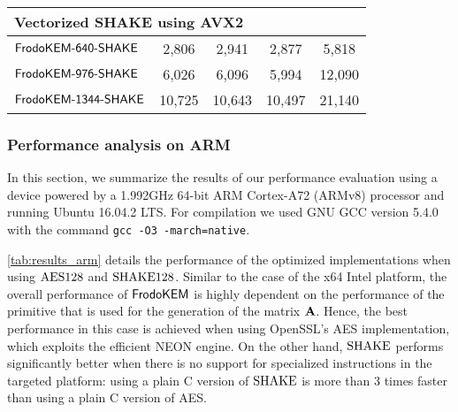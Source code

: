 \begin{table}[t]
\begin{tabular}{l|c c c|c}
\midrule
\multicolumn{5}{l}{\bf Vectorized SHAKE using AVX2} \\
\midrule
$\textsf{\upshape\mdseries FrodoKEM-640-SHAKE}$            &           2,806                  &           2,941                  &                2,877             &               5,818        \\
$\textsf{\upshape\mdseries FrodoKEM-976-SHAKE}$          &           6,026                  &           6,096                  &                5,994             &              12,090        \\
$\textsf{\upshape\mdseries FrodoKEM-1344-SHAKE}$          &          10,725                  &          10,643                &               10,497             &              21,140        \\
\bottomrule
\end{tabular}
\end{table}


\subsubsection{Performance analysis on ARM}\label{sec:results_arm}

\ifshoworiginal
In this section, we summarize the results of our performance evaluation using a device powered by a 1.992GHz 64-bit ARM Cortex-A72 (ARMv8) processor and running Ubuntu 16.04.2 LTS. For compilation we used GNU GCC version 5.4.0 with the command {\tt gcc -O3 -march=native}. 

\autoref{tab:results_arm} details the performance of the optimized implementations when using $\textrm{\upshape\mdseries AES128}$ and $\textrm{\upshape\mdseries SHAKE}128$. Similar to the case of the x64 Intel platform, the overall performance of $\textsf{\upshape\mdseries FrodoKEM}$ is highly dependent on the performance of the primitive that is used for the generation of the matrix $\mathbf{A}$. Hence, the best performance in this case is achieved when using OpenSSL's AES implementation, which exploits the efficient NEON engine. On the other hand, $\textrm{\upshape\mdseries SHAKE}$ performs significantly better when there is no support for specialized instructions in the targeted platform: using a plain C version of $\textrm{\upshape\mdseries SHAKE}$ is more than 3 times faster than using a plain C version of AES.

